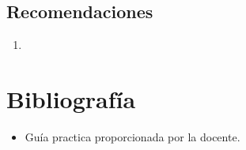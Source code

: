 \documentclass[12pt]{article}
\begin{document}
                \subsection{Recomendaciones}
                        \begin{enumerate}
                        \item 
                        \end{enumerate}


        \section{Bibliografía}
                \begin{itemize}
                        \item Guía practica proporcionada por la docente. 
                \end{itemize}
\end{document}
